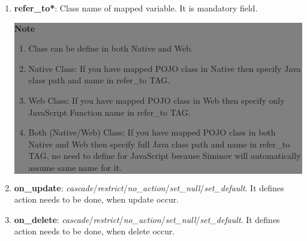 \begin{enumerate}
\begin{enumerate}
			\item \small \textbf{refer\_to*}: Class name of mapped variable. It is mandatory field.

			\begin{center}
				\colorbox{grey}{
					\parbox[t]{.8\linewidth}{
						\fontsize{11pt}{11pt}\selectfont %
						\vspace*{0.1cm} %
		
						\hfill \textbf{Note} \\
			
						\hfill 	
						\begin{enumerate}

							\item \small Class can be define in both Native and Web.

							\item \small Native Class: If you have mapped POJO class in Native then specify Java class path and name in refer\_to TAG.

							\item \small Web Class: If you have mapped POJO class in Web then specify only JavaScript Function name in refer\_to TAG.

							\item \small Both (Native/Web) Class: If you have mapped POJO class in both Native and Web then specify full Java class path and name in refer\_to TAG, no need to define for JavaScript because Siminov will automatically assume same name for it.	

						\end{enumerate}

						\vspace*{0.0cm} %
				}
			}

		\end{center}



			\item \small \textbf{on\_update}: \textit{cascade}/\textit{restrict}/\textit{no\_action}/\textit{set\_null}/\textit{set\_default}. It defines action needs to be done, when update occur.

			\item \small \textbf{on\_delete}: \textit{cascade}/\textit{restrict}/\textit{no\_action}/\textit{set\_null}/\textit{set\_default}. It defines action needs to be done, when delete occur.
		

\end{enumerate}
\end{enumerate}
